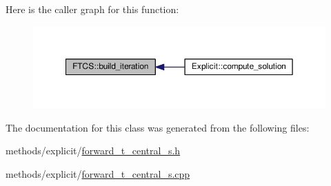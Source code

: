 Here is the caller graph for this function\+:
\nopagebreak
\begin{figure}[H]
\begin{center}
\leavevmode
\includegraphics[width=350pt]{classFTCS_abc8074dbb5a5facaf0380aa867998556_icgraph}
\end{center}
\end{figure}




The documentation for this class was generated from the following files\+:\begin{DoxyCompactItemize}
\item 
methods/explicit/\hyperlink{forward__t__central__s_8h}{forward\+\_\+t\+\_\+central\+\_\+s.\+h}\item 
methods/explicit/\hyperlink{forward__t__central__s_8cpp}{forward\+\_\+t\+\_\+central\+\_\+s.\+cpp}\end{DoxyCompactItemize}
